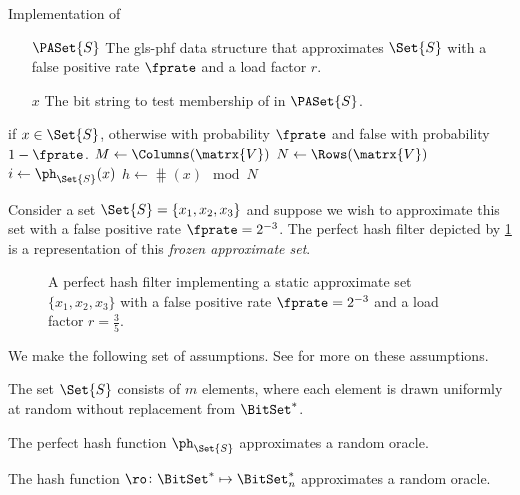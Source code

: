 \documentclass[ ../main.tex]{subfiles}
\begin{document}
\begin{algorithm}[h]
    \caption{Implementation of \protect\Contains}
    \label{alg:PHF_has}
    \KwIn
    {
        \begin{enumerate}
            \item[$\PASet{S}$] The \gls{gls-phf} data structure that approximates $\Set{S}$ with a false positive rate $\fprate$ and a load factor $r$.
            \item[$x$] The bit string to test membership of in $\PASet{S}$.
        \end{enumerate}
    }
    \KwOut
    {
        \True if $x \in \Set{S}$, otherwise \True with probability $\fprate$ and false with probability $1 - \fprate$.
    }
    {
        $M \gets \Columns(\matrx{V})$\;
        $N \gets \Rows(\matrx{V})$\;
        $i \gets \ph_{\Set{S}}\!\left(x\right)$\;
        $h \gets \hash(x) \mod N$\;
        \;
    }
\end{algorithm}

\begin{example}
Consider a set $\Set{S} = \{x_1, x_2, x_3\}$ and suppose we wish to approximate this set with a false positive rate $\fprate = 2^{-3}$. The perfect hash filter depicted by \cref{fig:PHFilter} is a representation of this \emph{frozen approximate set}.
\end{example}
\begin{figure}
\caption[Perfect hash filter]{A perfect hash filter implementing a static approximate set $\{x_1,x_2,x_3\}$ with a false positive rate $\fprate = 2^{-3}$ and a load factor $r = \frac{3}{5}$.}
\label{fig:PHFilter}
\centering

\end{figure}

We make the following set of assumptions. See \cite{oph} for more on these assumptions.
\begin{assumption}
The set $\Set{S}$ consists of $m$ elements, where each element is drawn uniformly at random without replacement from $\BitSet^*$.
\end{assumption}
\begin{assumption}
The perfect hash function $\ph_{\Set{S}}$ approximates a random oracle.
\end{assumption}
\begin{assumption}
\label{asm:ro}
The hash function $\ro \colon \BitSet^* \mapsto \BitSet^*_n$ approximates a random oracle.
\end{assumption}
\end{document}

